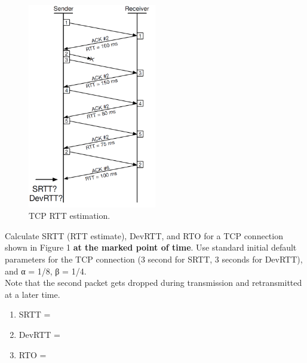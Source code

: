 \documentclass{report}
\begin{document}
\mktitle


\begin{problem}
\begin{figure}[!ht]
	\centering
	\includegraphics[width=0.5\textwidth]{image1.png}
	\caption{ TCP RTT estimation.}
	\centering
	\label{fig:image1}
\end{figure}

Calculate SRTT (RTT estimate), DevRTT, and RTO for a TCP connection shown in Figure 1 \textbf{at the marked point of time}. Use standard initial default parameters for the TCP connection (3 second for SRTT, 3 seconds for DevRTT), and α = 1/8, β = 1/4.\\
\indent Note that the second packet gets dropped during transmission and retransmitted at a later time.
\begin{enumerate}
	\item SRTT = 
	\item DevRTT = 
	\item RTO =
\end{enumerate}

\end{problem}
\end{document}
